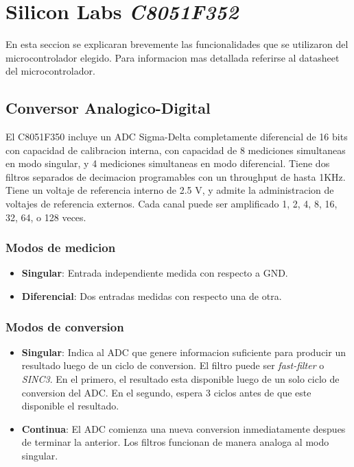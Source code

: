 \section{Silicon Labs \emph{C8051F352}} %
\label{sec:silicon_labs_c8051f352}

En esta seccion se explicaran brevemente las funcionalidades que se utilizaron del microcontrolador elegido. Para informacion mas detallada referirse al datasheet del microcontrolador. \cite{bib:datasheet}

\subsection{Conversor Analogico-Digital} %
\label{ssub:conversor_analogico_digital}

El C8051F350 incluye un ADC Sigma-Delta completamente diferencial de 16 bits con capacidad de calibracion interna, con capacidad de 8 mediciones simultaneas en modo singular, y 4 mediciones simultaneas en modo diferencial. Tiene dos filtros separados de decimacion programables con un throughput de hasta 1KHz. Tiene un voltaje de referencia interno de 2.5 V, y admite la administracion de voltajes de referencia externos. Cada canal puede ser amplificado 1, 2, 4, 8, 16, 32, 64, o 128 veces.

\subsubsection{Modos de medicion} %
\label{ssub:modos_de_medicion}

\begin{itemize}
  \item \textbf{Singular}: Entrada independiente medida con respecto a GND.
  \item \textbf{Diferencial}: Dos entradas medidas con respecto una de otra.
\end{itemize}

\subsubsection{Modos de conversion} %
\label{ssub:modos_de_conversion}

\begin{itemize}
  \item \textbf{Singular}: Indica al ADC que genere informacion suficiente para producir un resultado luego de un ciclo de conversion. El filtro puede ser \emph{fast-filter} o \emph{SINC3}. En el primero, el resultado esta disponible luego de un solo ciclo de conversion del ADC. En el segundo, espera 3 ciclos antes de que este disponible el resultado.
  \item \textbf{Continua}: El ADC comienza una nueva conversion inmediatamente despues de terminar la anterior. Los filtros funcionan de manera analoga al modo singular.
\end{itemize}

